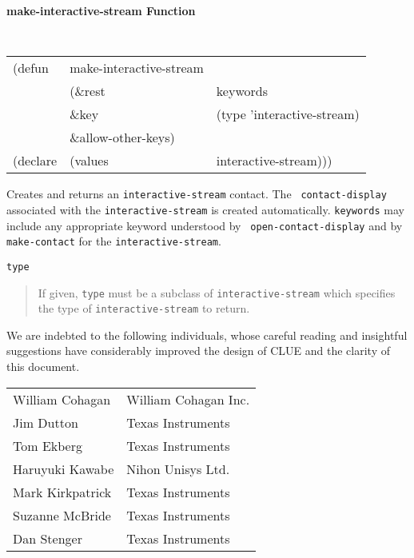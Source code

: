 {\samepage
{\large {\bf make-interactive-stream \hfill Function}} 
\begin{flushright} \parbox[t]{6.125in}{
\tt
\begin{tabular}{lll}
\raggedright
(defun & make-interactive-stream & \\ 
& (\&rest & keywords\\
&\&key & (type 'interactive-stream)\\
&\&allow-other-keys) \\
(declare &(values  & interactive-stream))) 
\end{tabular}
\rm

}\end{flushright}}

\begin{flushright} \parbox[t]{6.125in}{
Creates and returns an {\tt interactive-stream} contact. The {\tt
contact-display} associated with the {\tt interactive-stream} is created
automatically. {\tt keywords} may include any appropriate
keyword understood by {\tt
open-contact-display}
and by {\tt make-contact} 
for the {\tt interactive-stream}.

}\end{flushright}


\begin{flushright} \parbox[t]{6.125in}{
{\tt type}
\begin{quote}
If given, {\tt type} must be a subclass of {\tt interactive-stream} which
specifies the type of {\tt interactive-stream} to return.
\end{quote}

}\end{flushright}


We are indebted to the following individuals, whose
careful reading and insightful suggestions have considerably improved the design
of CLUE and the clarity of this document.

\begin{tabular}{ll}
William Cohagan &       William Cohagan Inc.\\
Jim Dutton      &       Texas Instruments \\
Tom Ekberg      &       Texas Instruments \\
Haruyuki Kawabe &       Nihon Unisys Ltd. \\
Mark Kirkpatrick &      Texas Instruments \\
Suzanne McBride &       Texas Instruments \\
Dan Stenger     &       Texas Instruments \\
\end{tabular}

